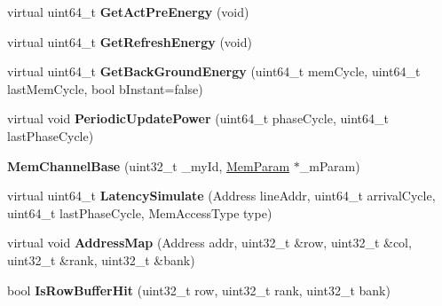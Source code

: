 \begin{DoxyCompactItemize}
\item 
\hypertarget{classMemChannelBase_acc0b3c449b8510255366da62f21b32a2}{virtual uint64\-\_\-t {\bfseries Get\-Act\-Pre\-Energy} (void)}\label{classMemChannelBase_acc0b3c449b8510255366da62f21b32a2}

\item 
\hypertarget{classMemChannelBase_a380b6b65ddbc0de0d9bb3ecc199d85c0}{virtual uint64\-\_\-t {\bfseries Get\-Refresh\-Energy} (void)}\label{classMemChannelBase_a380b6b65ddbc0de0d9bb3ecc199d85c0}

\item 
\hypertarget{classMemChannelBase_a9c734e2143117c54de9f98054dad2ca7}{virtual uint64\-\_\-t {\bfseries Get\-Back\-Ground\-Energy} (uint64\-\_\-t mem\-Cycle, uint64\-\_\-t last\-Mem\-Cycle, bool b\-Instant=false)}\label{classMemChannelBase_a9c734e2143117c54de9f98054dad2ca7}

\item 
\hypertarget{classMemChannelBase_a796fe1cfd947821d2127f1b2acd1541f}{virtual void {\bfseries Periodic\-Update\-Power} (uint64\-\_\-t phase\-Cycle, uint64\-\_\-t last\-Phase\-Cycle)}\label{classMemChannelBase_a796fe1cfd947821d2127f1b2acd1541f}

\item 
\hypertarget{classMemChannelBase_a2e476e5df6a1f1a2af74176f5f430780}{{\bfseries Mem\-Channel\-Base} (uint32\-\_\-t \-\_\-my\-Id, \hyperlink{classMemParam}{Mem\-Param} $\ast$\-\_\-m\-Param)}\label{classMemChannelBase_a2e476e5df6a1f1a2af74176f5f430780}

\item 
\hypertarget{classMemChannelBase_a5e55e478b895ff08e84d029e48920bf5}{virtual uint64\-\_\-t {\bfseries Latency\-Simulate} (Address line\-Addr, uint64\-\_\-t arrival\-Cycle, uint64\-\_\-t last\-Phase\-Cycle, Mem\-Access\-Type type)}\label{classMemChannelBase_a5e55e478b895ff08e84d029e48920bf5}

\item 
\hypertarget{classMemChannelBase_a78a61cca1e755fc4b896b1983fdb0e03}{virtual void {\bfseries Address\-Map} (Address addr, uint32\-\_\-t \&row, uint32\-\_\-t \&col, uint32\-\_\-t \&rank, uint32\-\_\-t \&bank)}\label{classMemChannelBase_a78a61cca1e755fc4b896b1983fdb0e03}

\item 
\hypertarget{classMemChannelBase_a7e37609da4d99dcf76b94e85e76d6f3d}{bool {\bfseries Is\-Row\-Buffer\-Hit} (uint32\-\_\-t row, uint32\-\_\-t rank, uint32\-\_\-t bank)}\label{classMemChannelBase_a7e37609da4d99dcf76b94e85e76d6f3d}


\end{DoxyCompactItemize}
